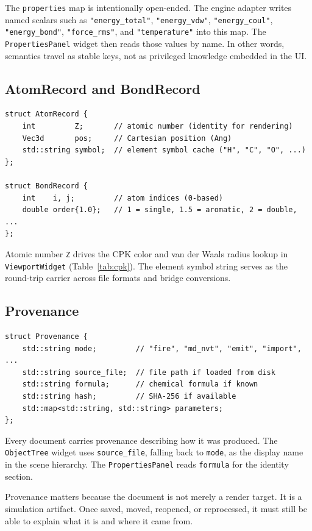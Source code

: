 ﻿\documentclass[11pt]{article}
\newcommand{\type}[1]{\texttt{#1}}
\newcommand{\field}[1]{\texttt{#1}}
\begin{document}
The \field{properties} map is intentionally open-ended. The engine adapter
writes named scalars such as \texttt{"energy\_total"},
\texttt{"energy\_vdw"}, \texttt{"energy\_coul"},
\texttt{"energy\_bond"}, \texttt{"force\_rms"}, and
\texttt{"temperature"} into this map. The \type{PropertiesPanel} widget then
reads those values by name. In other words, semantics travel as stable keys,
not as privileged knowledge embedded in the UI.

\subsection{AtomRecord and BondRecord}

\begin{lstlisting}
struct AtomRecord {
    int         Z;       // atomic number (identity for rendering)
    Vec3d       pos;     // Cartesian position (Ang)
    std::string symbol;  // element symbol cache ("H", "C", "O", ...)
};

struct BondRecord {
    int    i, j;         // atom indices (0-based)
    double order{1.0};   // 1 = single, 1.5 = aromatic, 2 = double, ...
};
\end{lstlisting}

Atomic number \field{Z} drives the CPK color and van der Waals radius lookup
in \type{ViewportWidget} (Table~\ref{tab:cpk}). The element symbol string
serves as the round-trip carrier across file formats and bridge conversions.

\subsection{Provenance}

\begin{lstlisting}
struct Provenance {
    std::string mode;         // "fire", "md_nvt", "emit", "import", ...
    std::string source_file;  // file path if loaded from disk
    std::string formula;      // chemical formula if known
    std::string hash;         // SHA-256 if available
    std::map<std::string, std::string> parameters;
};
\end{lstlisting}

Every document carries provenance describing how it was produced. The
\type{ObjectTree} widget uses \field{source\_file}, falling back to
\field{mode}, as the display name in the scene hierarchy. The
\type{PropertiesPanel} reads \field{formula} for the identity section.

Provenance matters because the document is not merely a render target. It is a
simulation artifact. Once saved, moved, reopened, or reprocessed, it must
still be able to explain what it is and where it came from.
\end{document}
